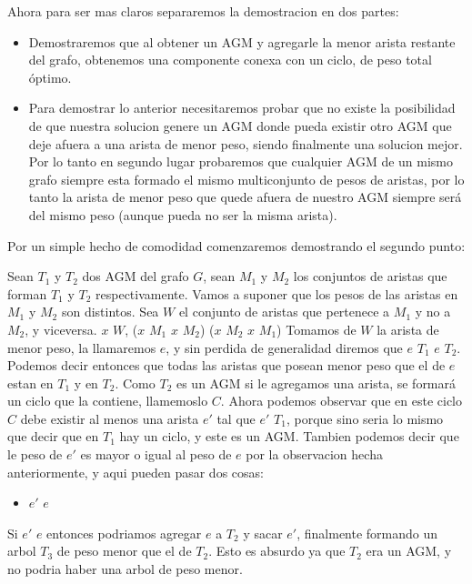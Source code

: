 Ahora para ser mas claros separaremos la demostracion en dos partes:

\begin{itemize}
\item Demostraremos que al obtener un AGM y agregarle la menor arista restante del grafo, obtenemos una componente conexa con un ciclo, de peso total óptimo.
\item Para demostrar lo anterior necesitaremos probar que no existe la posibilidad de que nuestra solucion genere un AGM donde pueda existir otro AGM que deje afuera a una arista de menor peso, siendo finalmente una solucion mejor. Por lo tanto en segundo lugar probaremos que cualquier AGM de un mismo grafo siempre esta formado el mismo multiconjunto de pesos de aristas, por lo tanto la arista de menor peso que quede afuera de nuestro AGM siempre será del mismo peso (aunque pueda no ser la misma arista).
\end{itemize}

Por un simple hecho de comodidad comenzaremos demostrando el segundo punto:

Sean $T_1$ y $T_2$ dos AGM del grafo $G$, sean $M_1$ y $M_2$ los conjuntos de aristas que forman $T_1$ y $T_2$ respectivamente. Vamos a suponer que los pesos de las aristas en $M_1$ y $M_2$ son distintos. Sea $W$ el conjunto de aristas que pertenece a $M_1$ y no a $M_2$, y viceversa. \forall $x$ \in $W$, ($x$ \in $M_1$ \wedge $x$ \nin $M_2$) \vee ($x$ \in $M_2$ \wedge $x$ \in $M_1$)
Tomamos de $W$ la arista de menor peso, la llamaremos $e$, y sin perdida de generalidad diremos que $e$ \in $T_1$ \wedge $e$ \nin $T_2$. Podemos decir entonces que todas las aristas que posean menor peso que el de $e$ estan en $T_1$ y en $T_2$.
Como $T_2$ es un AGM si le agregamos una arista, se formar\'a un ciclo que la contiene, llamemoslo $C$. Ahora podemos observar que en este ciclo $C$ debe existir al menos una arista $e'$ tal que $e'$ \nin $T_1$, porque sino seria lo mismo que decir que en $T_1$ hay un ciclo, y este es un AGM. Tambien podemos decir que le peso de $e'$ es mayor o igual al peso de $e$ por la observacion hecha anteriormente, y aqui pueden pasar dos cosas:
\begin{itemize}
\item $e'$ \geq $e$
\end{itemize}
Si $e'$ \geq $e$ entonces podriamos agregar $e$ a $T_2$ y sacar $e'$, finalmente formando un arbol $T_3$ de peso menor que el de $T_2$. Esto es absurdo ya que $T_2$ era un AGM, y no podria haber una arbol de peso menor.

